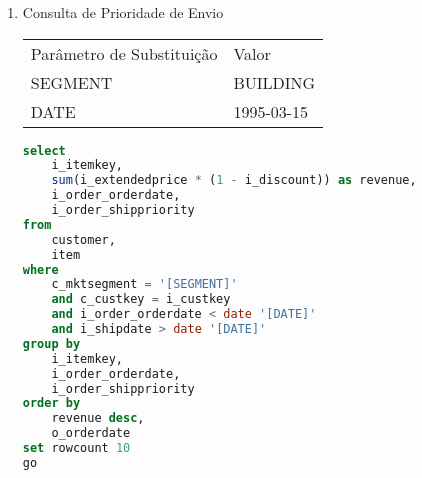 \begin{enumerate}

\item Consulta de Prioridade de Envio
	
	\begin{tabular}{ll}
	Parâmetro de Substituição & Valor\\
	SEGMENT & BUILDING\\
	DATE & 1995-03-15\\
\end{tabular}

	\begin{lstlisting}[language=SQL]
select
	i_itemkey,
	sum(i_extendedprice * (1 - i_discount)) as revenue,
	i_order_orderdate,
	i_order_shippriority
from
	customer,
	item
where
	c_mktsegment = '[SEGMENT]'
	and c_custkey = i_custkey
	and i_order_orderdate < date '[DATE]'
	and i_shipdate > date '[DATE]'
group by
	i_itemkey,
	i_order_orderdate,
	i_order_shippriority
order by
	revenue desc,
	o_orderdate
set rowcount 10
go
	\end{lstlisting}
	
	



\end{enumerate}
